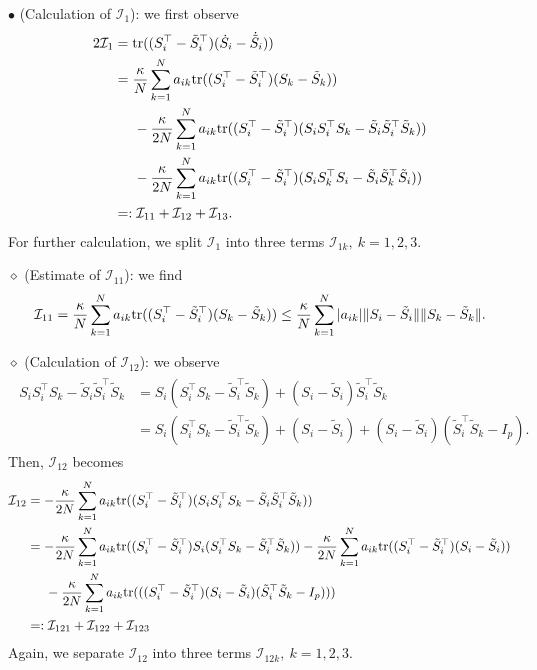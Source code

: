 \documentclass[11pt,reqno]{amsart}
\numberwithin{figure}{section}
\newcommand{\kp}{\kappa}
\newcommand{\tr}{{\textup{tr}}}
\begin{document}
\noindent $\bullet$ (Calculation of $\mathcal I_1$):  we first observe
\begin{align} \label{C-18}
\begin{aligned}
2\mathcal I_1 & = \tr( ( S_i^\top - \tilde S_i^\top)(\dot S_i - \dot{\tilde S}_i)) \\
& = \frac\kp N \sum_{k=1}^N a_{ik} \tr( (S_i^\top - \tilde S_i^\top ) (S_k - \tilde S_k) )\\
&\hspace{0.5cm} -\frac{\kp}{2N} \sum_{k=1}^N a_{ik} \tr( ( S_i^\top - \tilde S_i^\top) ( S_i S_i^\top S_k - \tilde S_i \tilde S_i^\top \tilde S_k) ) \\
&\hspace{0.5cm} -\frac{\kp}{2N} \sum_{k=1}^N a_{ik} \tr( ( S_i^\top - \tilde S_i^\top) (S_iS_k^\top S_i - \tilde S_i \tilde S_k^\top \tilde S_i)) \\
& =: \mathcal I_{11} + \mathcal I_{12} + \mathcal I_{13}.
\end{aligned}
\end{align}
For further calculation, we split $\mathcal I_1$ into three terms $\mathcal I_{1k},~k=1,2,3$. \newline 

$\diamond$ (Estimate of $\mathcal I_{11}$): we find
\begin{equation} \label{C-19}
\mathcal I_{11} = \frac\kp N \sum_{k=1}^N a_{ik} \tr( (S_i^\top - \tilde S_i^\top ) (S_k - \tilde S_k) )  \leq \frac\kp N \sum_{k=1}^N |a_{ik}| \|S_i - \tilde S_i\| \|S_k - \tilde S_k \|.
\end{equation}  

$\diamond$ (Calculation of $\mathcal I_{12}$): we observe 
\begin{align} \label{C-20}
\begin{aligned}
S_i S_i^\top S_k - \tilde S_i \tilde S_i^\top \tilde S_k & = S_i (S_i^\top S_k - \tilde S_i^\top \tilde S_k ) + (S_i - \tilde S_i) \tilde S_i^\top \tilde S_k \\
&= S_i (S_i^\top S_k - \tilde S_i^\top \tilde S_k ) + ( S_i - \tilde S_i) + (S_i - \tilde S_i)(\tilde S_i^\top \tilde S_k -I_p).
\end{aligned}
\end{align}
Then, $\mathcal I_{12}$ becomes
\begin{align*}
\mathcal I_{12} & =  -\frac{\kp}{2N} \sum_{k=1}^N a_{ik} \tr( ( S_i^\top - \tilde S_i^\top) ( S_i S_i^\top S_k - \tilde S_i \tilde S_i^\top \tilde S_k) ) \\
& = -\frac{\kp}{2N} \sum_{k=1}^N a_{ik} \tr( ( S_i ^\top - \tilde S_i^\top) S_i ( S_i^\top S_k - \tilde S_i^\top \tilde S_k)) - \frac{\kp}{2N} \sum_{k=1}^N a_{ik} \tr(( S_i^\top - \tilde S_i^\top) (S_i - \tilde S_i)) \\
 & \hspace{0.5cm}-\frac{\kp}{2N} \sum_{k=1}^N a_{ik} \tr(( (S_i^\top -\tilde S_i^\top)(S_i - \tilde S_i) (\tilde S_i^\top \tilde S_k - I_p))) \\
 & =: \mathcal I_{121} + \mathcal I_{122} + \mathcal I_{123} 
\end{align*} 
Again, we separate $\mathcal I_{12}$ into three terms $\mathcal I_{12k},~k=1,2,3$. \newline  
\end{document}
